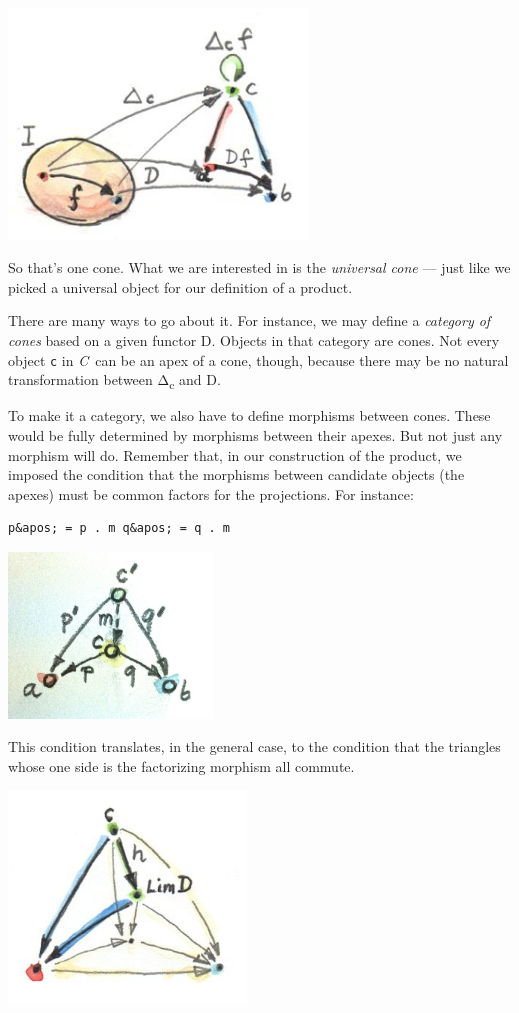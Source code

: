 \includegraphics[width=3.12500in]{images/conenaturality.jpg}

So that's one cone. What we are interested in is the \emph{universal
cone} --- just like we picked a universal object for our definition of a
product.

There are many ways to go about it. For instance, we may define a
\emph{category of cones} based on a given functor D. Objects in that
category are cones. Not every object \texttt{c} in \emph{C}~can be an
apex of a cone, though, because there may be no natural transformation
between Δ\textsubscript{c} and D.

To make it a category, we also have to define morphisms between cones.
These would be fully determined by morphisms between their apexes. But
not just any morphism will do. Remember that, in our construction of the
product, we imposed the condition that the morphisms between candidate
objects (the apexes) must be common factors for the projections. For
instance:

\begin{verbatim}
p&apos; = p . m q&apos; = q . m
\end{verbatim}

\includegraphics[width=2.13542in]{images/productranking.jpg}

This condition translates, in the general case, to the condition that
the triangles whose one side is the factorizing morphism all commute.

\hypertarget{attachment_4487}{}
\includegraphics[width=2.48958in]{images/conecommutativity.jpg}

